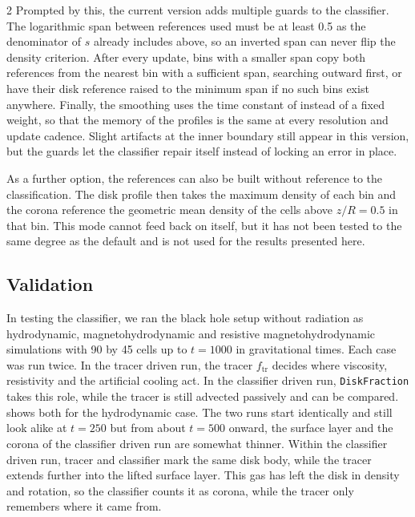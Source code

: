 \begin{multicols}{2}
	Prompted by this, the current version adds multiple guards to the classifier. The logarithmic span between references used must be at least
	\qty{0.5}{\dex} as the denominator of $s$ already includes above, so an inverted span can never flip the
	density criterion. After every update, bins with a smaller span copy both references from the nearest bin with a sufficient
	span, searching outward first, or have their disk reference raised to the minimum span if no such bins exist anywhere. Finally,
	the smoothing uses the time constant of  instead of a fixed weight, so that the memory of the profiles is the same
	at every resolution and update cadence. Slight artifacts at the inner boundary still appear in this version, but the guards
	let the classifier repair itself instead of locking an error in place.

	As a further option, the references can also be built without reference to the classification. The disk profile then takes the
	maximum density of each bin and the corona reference the geometric mean density of the cells above $z / R = 0.5$ in that bin.
	This mode cannot feed back on itself, but it has not been tested to the same degree as the default and is not used for the results
	presented here.

	\subsection{Validation}

	In testing the classifier, we ran the black hole setup without radiation as hydrodynamic, magnetohydrodynamic and resistive
	magnetohydrodynamic simulations with \num{90} by \num{45} cells up to $t = 1000$ in gravitational times. Each case was run
	twice. In the tracer driven run, the tracer $f_\mathrm{tr}$ decides where viscosity, resistivity and the artificial cooling
	act. In the classifier driven run, \texttt{DiskFraction} takes this role, while the tracer is still advected passively and
	can be compared.  shows both for the hydrodynamic case. The two runs start identically and still look alike
	at $t = 250$ but from about $t = 500$ onward, the surface layer and the corona of the classifier driven run are somewhat thinner.
	Within the classifier driven run, tracer and classifier mark the same disk body, while the tracer extends further into the lifted
	surface layer. This gas has left the disk in density and rotation, so the classifier counts it as corona, while the tracer
	only remembers where it came from.


\end{multicols}
